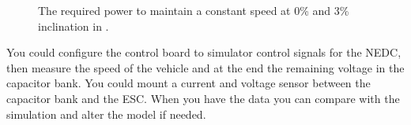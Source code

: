 \documentclass[final]{scrreprt} %
\begin{document}
\begin{figure}[H]
	\centering
    	\setlength\figureheight{4cm}
    	\setlength{}
    	
    	\label{fig:power-req}
    	\caption{The required power to maintain a constant speed at 0\% and 3\% inclination in \watt.}
\end{figure}
You could configure the control board to simulator control signals for the NEDC, then measure the speed of the vehicle and at the end the remaining voltage in the capacitor bank.
You could mount a current and voltage sensor between the capacitor bank and the ESC.
When you have the data you can compare with the simulation and alter the model if needed.
\end{document}
